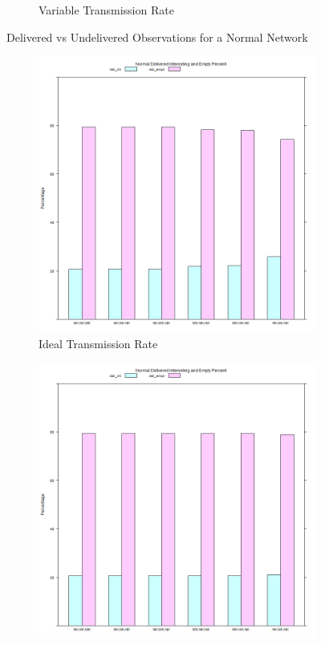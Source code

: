 \begin{figure}[H]
\begin{subfigure}{.5\textwidth}
  \caption{Variable Transmission Rate}
	\label{fig:sim:res:norm:variable:delundel}
\end{subfigure}
\caption{Delivered vs Undelivered Observations for a Normal Network}
\end{figure}

\begin{figure}[H]
\centering
\begin{subfigure}{.5\textwidth}
  \centering
\includegraphics[width=\textwidth]{Chap7/figures/plots/normal_variable/emptvsint_percent.png}
  \caption{Ideal Transmission Rate}
	\label{fig:sim:res:norm:ideal:emptint}
\end{subfigure}%
\begin{subfigure}{.5\textwidth}
  \centering
\includegraphics[width=\textwidth]{Chap7/figures/plots/normal_ideal/emptvsint_percent.png}

\end{subfigure}
\end{figure}

